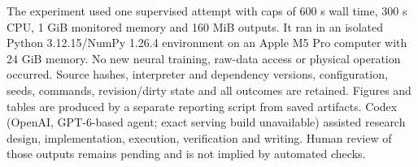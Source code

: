 The experiment used one supervised attempt with caps of 600 s wall time, 300 s CPU, 1 GiB monitored memory and 160 MiB outputs. It ran in an isolated Python 3.12.15/NumPy 1.26.4 environment on an Apple M5 Pro computer with 24 GiB memory. No new neural training, raw-data access or physical operation occurred. Source hashes, interpreter and dependency versions, configuration, seeds, commands, revision/dirty state and all outcomes are retained. Figures and tables are produced by a separate reporting script from saved artifacts. Codex (OpenAI, GPT-6-based agent; exact serving build unavailable) assisted research design, implementation, execution, verification and writing. Human review of those outputs remains pending and is not implied by automated checks.
